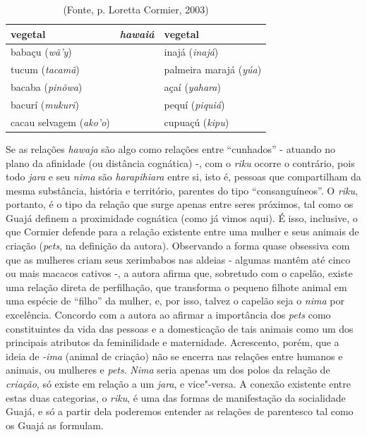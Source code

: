 \begin{table}[H]
\centering
\caption{(Fonte, p. Loretta Cormier, 2003)}
\label{my-label}
\begin{tabular}{|l|l|l|}
\hline
\textbf{vegetal}       & \textit{\textbf{hawaiá}} & \textbf{vegetal}      \\ \hline
babaçu (\emph{wã'y})          &                         & inajá (\emph{inajá})         \\ \hline
tucum (\emph{tacamã})         &                         & palmeira marajá (\emph{yúa}) \\ \hline
bacaba (\emph{pinõwa})        &                         & açaí (\emph{yahara})         \\ \hline
bacurí (\emph{mukuri})        &                         & pequí (\emph{piquiá})        \\ \hline
cacau selvagem (\emph{ako'o}) &                         & cupuaçú (\emph{kipu})        \\ \hline
\end{tabular}
\end{table}

Se as relações \emph{hawaja} são algo como relações entre ``cunhados'' -
atuando no plano da afinidade (ou distância cognática) -, com o
\emph{riku} ocorre o contrário, pois todo \emph{jara} e seu \emph{nima}
são \emph{harapihiara} entre si, isto é, pessoas que compartilham da
mesma substância, história e território, parentes do tipo
``consanguíneos''. O \emph{riku}, portanto, é o tipo da relação que surge
apenas entre seres próximos, tal como os Guajá definem a proximidade
cognática (como já vimos aqui). É isso, inclusive, o que Cormier defende
para a relação existente entre uma mulher e seus animais de criação
(\emph{pets}, na definição da autora). Observando a forma quase
obsessiva com que as mulheres criam seus xerimbabos nas aldeias -
algumas mantêm até cinco ou mais macacos cativos -, a autora afirma que,
sobretudo com o capelão, existe uma relação direta de perfilhação, que
transforma o pequeno filhote animal em uma espécie de ``filho'' da mulher,
e, por isso, talvez o capelão seja o \emph{nima} por excelência.
Concordo com a autora ao afirmar a importância dos \emph{pets} como
constituintes da vida das pessoas e a domesticação de tais animais como
um dos principais atributos da feminilidade e maternidade. Acrescento,
porém, que a ideia de \emph{-ima} (animal de criação) não se encerra nas
relações entre humanos e animais, ou mulheres e \emph{pets}. \emph{Nima}
seria apenas um dos polos da relação de \emph{criação}, só existe em
relação a um \emph{jara}, e vice"-versa. A conexão existente entre estas
duas categorias, o \emph{riku}, é uma das formas de manifestação da
socialidade Guajá, e só a partir dela poderemos entender as relações de
parentesco tal como os Guajá as formulam.

